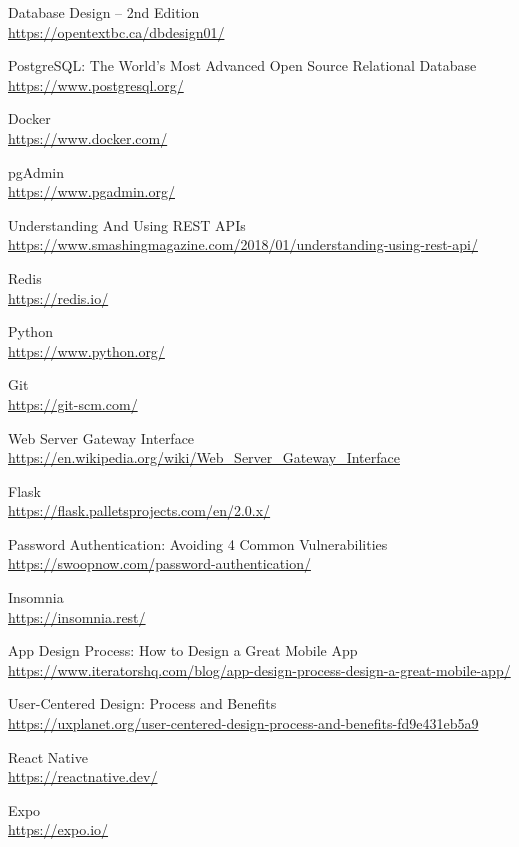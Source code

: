 \documentclass[11pt,a4paper,english]{article}
\begin{document}
\begin{thebibliography}{99}
Database Design – 2nd Edition
\\\url{https://opentextbc.ca/dbdesign01/}

PostgreSQL: The World's Most Advanced Open Source Relational Database
\\\url{https://www.postgresql.org/}

Docker
\\\url{https://www.docker.com/}

pgAdmin
\\\url{https://www.pgadmin.org/}

Understanding And Using REST APIs
\\\url{https://www.smashingmagazine.com/2018/01/understanding-using-rest-api/}

Redis
\\\url{https://redis.io/}

Python
\\\url{https://www.python.org/}

Git
\\\url{https://git-scm.com/}

Web Server Gateway Interface
\\\url{https://en.wikipedia.org/wiki/Web_Server_Gateway_Interface}

Flask
\\\url{https://flask.palletsprojects.com/en/2.0.x/}

Password Authentication: Avoiding 4 Common Vulnerabilities
\\\url{https://swoopnow.com/password-authentication/}

Insomnia
\\\url{https://insomnia.rest/}

App Design Process: How to Design a Great Mobile App
\\\url{https://www.iteratorshq.com/blog/app-design-process-design-a-great-mobile-app/}

User-Centered Design: Process and Benefits
\\\url{https://uxplanet.org/user-centered-design-process-and-benefits-fd9e431eb5a9}

React Native
\\\url{https://reactnative.dev/}

Expo
\\\url{https://expo.io/}


\end{thebibliography}
\end{document}

